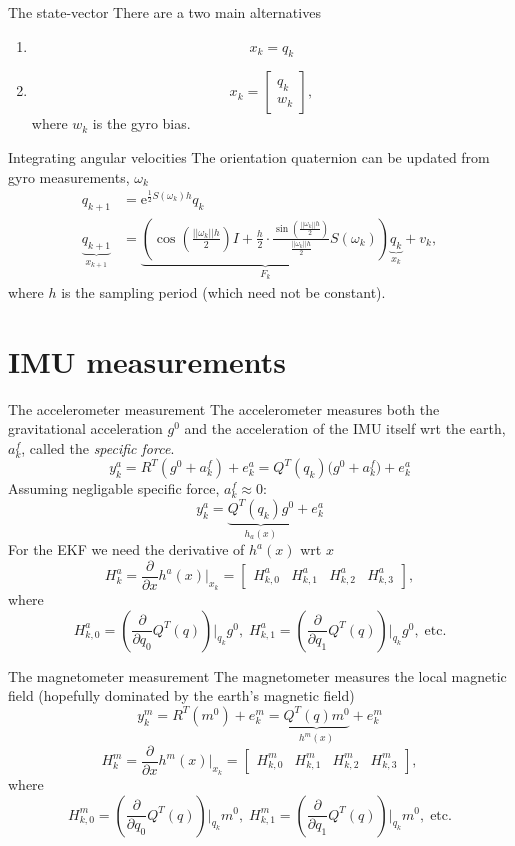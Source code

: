 \documentclass[presentation,aspectratio=169]{beamer}
\begin{document}
\begin{frame}[label=sec-3-4]{The state-vector}
There are a two main alternatives 
\begin{enumerate}
\item \[ x_k = q_k\]
\item \[ x_k = \begin{bmatrix} q_k\\ w_k\end{bmatrix}, \]
      where \(w_k\) is the gyro bias.
\end{enumerate}
\end{frame}

\begin{frame}[label=sec-3-5]{Integrating angular velocities}
The orientation quaternion can be updated from gyro measurements, $\omega_k$
\begin{align*}
 q_{k+1} &= \mathrm{e}^{\frac{1}{2}S(\omega_k)h} q_k\\
 \underbrace{q_{k+1}}_{x_{k+1}} &= \underbrace{\left( \cos(\frac{||\omega_k||h}{2})I + \frac{h}{2}\cdot\frac{\sin(\frac{||\omega_k||h}{2})}{\frac{||\omega_k||h}{2}}S(\omega_k)\right)}_{F_k} \underbrace{q_k}_{x_k} + v_k,
 \end{align*}
where $h$ is the sampling period (which need not be constant). 
\end{frame}

\section{IMU measurements}
\label{sec-4}
\begin{frame}[label=sec-4-1]{The accelerometer measurement}
The accelerometer measures both the gravitational acceleration $g^0$ and the acceleration of the IMU itself wrt the earth, $a^f_k$, called the \emph{specific force}.
\[ y_k^a = R^T(g^0 + a_k^f) + e_k^a = Q^T(q_k)\big(g^0 + a_k^f\big) + e_k^a\]
Assuming negligable specific force, $a_k^f\approx 0$:
\[ y_k^a = \underbrace{Q^T(q_k)g^0}_{h_a(x)} + e_k^a\]
For the EKF we need the derivative of $h^a(x)$ wrt $x$
\[ H^a_k = \frac{\partial}{\partial x}h^a(x)|_{x_k} = \begin{bmatrix}H^a_{k,0} & H^a_{k,1} & H^a_{k,2} & H^a_{k,3}\end{bmatrix}, \]
where
\[H^a_{k,0} = \left(\frac{\partial}{\partial q_0}Q^T(q)\right)\Big|_{q_k}g^0, \; H^a_{k,1} = \left(\frac{\partial}{\partial q_1}Q^T(q)\right)\Big|_{q_k}g^0, \; \text{etc.}\]
\end{frame}

\begin{frame}[label=sec-4-2]{The magnetometer measurement}
The magnetometer measures the local magnetic field (hopefully dominated by the earth's magnetic field)
\[ y_k^m = R^T(m^0) + e_k^m = \underbrace{Q^T(q)m^0}_{h^m(x)} + e_k^m\]
\[ H^m_k = \frac{\partial}{\partial x}h^m(x)|_{x_k} = \begin{bmatrix}H^m_{k,0} & H^m_{k,1} & H^m_{k,2} & H^m_{k,3}\end{bmatrix}, \]
where
\[H^m_{k,0} = \left(\frac{\partial}{\partial q_0}Q^T(q)\right)\Big|_{q_k}m^0, \; H^m_{k,1} = \left(\frac{\partial}{\partial q_1}Q^T(q)\right)\Big|_{q_k}m^0, \; \text{etc.}\]
\end{frame}
\end{document}
